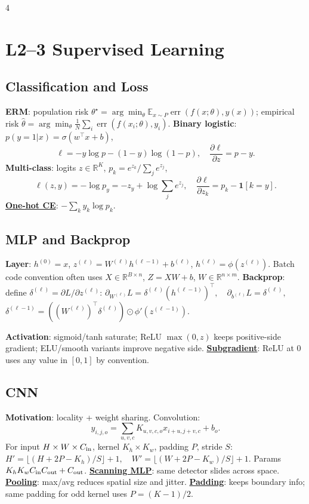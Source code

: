 \documentclass{article}
\newcommand{\key}[1]{\textbf{#1}}
\newcommand{\lowterm}[1]{\textbf{\underline{#1}}}
\newcommand{\R}{\mathbb{R}}
\newcommand{\E}{\mathbb{E}}
\newcommand{\1}{\mathbf 1}
\begin{document}
\tiny
\begin{multicols*}{4}

\section{L2--3 Supervised Learning}
\subsection{Classification and Loss}
\key{ERM}: population risk $\theta^\star=\arg\min_\theta\E_{x\sim P}\operatorname{err}(f(x;\theta),y(x))$; empirical risk $\hat\theta=\arg\min_\theta\frac1N\sum_i\operatorname{err}(f(x_i;\theta),y_i)$. \key{Binary logistic}: $p(y=1|x)=\sigma(w^\top x+b)$,
\[
\ell=-y\log p-(1-y)\log(1-p),\quad \frac{\partial\ell}{\partial z}=p-y.
\]
\key{Multi-class}: logits $z\in\R^K$, $p_k=e^{z_k}/\sum_j e^{z_j}$,
\[
\ell(z,y)=-\log p_y=-z_y+\log\sum_j e^{z_j},\quad
\frac{\partial\ell}{\partial z_k}=p_k-\1[k=y].
\]
\lowterm{One-hot CE}: $-\sum_k y_k\log p_k$.

\subsection{MLP and Backprop}
\key{Layer}: $h^{(0)}=x$, $z^{(\ell)}=W^{(\ell)}h^{(\ell-1)}+b^{(\ell)}$, $h^{(\ell)}=\phi(z^{(\ell)})$. Batch code convention often uses $X\in\R^{B\times n}$, $Z=XW+b$, $W\in\R^{n\times m}$.
\key{Backprop}: define $\delta^{(\ell)}=\partial L/\partial z^{(\ell)}$:
\(
\partial_{W^{(\ell)}}L=\delta^{(\ell)}(h^{(\ell-1)})^\top,\quad
\partial_{b^{(\ell)}}L=\delta^{(\ell)},\quad
\)
\(
\delta^{(\ell-1)}=((W^{(\ell)})^\top\delta^{(\ell)})\odot\phi'(z^{(\ell-1)}).
\)

\key{Activation}: sigmoid/tanh saturate; ReLU $\max(0,z)$ keeps positive-side gradient; ELU/smooth variants improve negative side. \lowterm{Subgradient}: ReLU at $0$ uses any value in $[0,1]$ by convention.

\subsection{CNN}
\key{Motivation}: locality + weight sharing. Convolution:
\[
y_{i,j,o}=\sum_{u,v,c}K_{u,v,c,o}x_{i+u,j+v,c}+b_o.
\]
For input $H\times W\times C_{\rm in}$, kernel $K_h\times K_w$, padding $P$, stride $S$:
\(
H'=\lfloor(H+2P-K_h)/S\rfloor+1,\quad
W'=\lfloor(W+2P-K_w)/S\rfloor+1.
\)
Params $K_hK_wC_{\rm in}C_{\rm out}+C_{\rm out}$. \lowterm{Scanning MLP}: same detector slides across space. \lowterm{Pooling}: max/avg reduces spatial size and jitter. \lowterm{Padding}: keeps boundary info; same padding for odd kernel uses $P=(K-1)/2$.


\end{multicols*}
\end{document}
